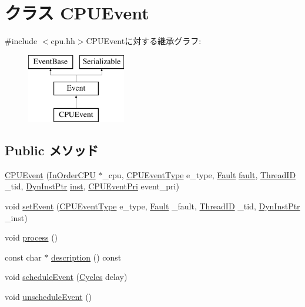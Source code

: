 \hypertarget{classInOrderCPU_1_1CPUEvent}{
\section{クラス CPUEvent}
\label{classInOrderCPU_1_1CPUEvent}
}


{\ttfamily \#include $<$cpu.hh$>$}CPUEventに対する継承グラフ:\begin{figure}[H]
\begin{center}
\leavevmode
\includegraphics[height=3cm]{classInOrderCPU_1_1CPUEvent}
\end{center}
\end{figure}
\subsection*{Public メソッド}
\begin{DoxyCompactItemize}
\item 
\hyperlink{classInOrderCPU_1_1CPUEvent_ae9e21ea59aa814f54bf9cbe72ac632d5}{CPUEvent} (\hyperlink{classInOrderCPU_1_1InOrderCPU}{InOrderCPU} $\ast$\_\-cpu, \hyperlink{classInOrderCPU_aedc081b7a3ef1b1568e62dec4a64c1ca}{CPUEventType} e\_\-type, \hyperlink{classRefCountingPtr}{Fault} \hyperlink{classInOrderCPU_1_1CPUEvent_a68714ceb74c60ea7ef5dec335bb6c5d7}{fault}, \hyperlink{base_2types_8hh_ab39b1a4f9dad884694c7a74ed69e6a6b}{ThreadID} \_\-tid, \hyperlink{classRefCountingPtr}{DynInstPtr} \hyperlink{classInOrderCPU_1_1CPUEvent_af5d4fb974eeb4507d4c837d365d0cefc}{inst}, \hyperlink{classInOrderCPU_a4381feb1878b9c1ea6f5dd3eed8d3197}{CPUEventPri} event\_\-pri)
\item 
void \hyperlink{classInOrderCPU_1_1CPUEvent_a8f450de378476d87c71f9a3790d68c02}{setEvent} (\hyperlink{classInOrderCPU_aedc081b7a3ef1b1568e62dec4a64c1ca}{CPUEventType} e\_\-type, \hyperlink{classRefCountingPtr}{Fault} \_\-fault, \hyperlink{base_2types_8hh_ab39b1a4f9dad884694c7a74ed69e6a6b}{ThreadID} \_\-tid, \hyperlink{classRefCountingPtr}{DynInstPtr} \_\-inst)
\item 
void \hyperlink{classInOrderCPU_1_1CPUEvent_a2e9c5136d19b1a95fc427e0852deab5c}{process} ()
\item 
const char $\ast$ \hyperlink{classInOrderCPU_1_1CPUEvent_a5a14fe478e2393ff51f02e9b7be27e00}{description} () const 
\item 
void \hyperlink{classInOrderCPU_1_1CPUEvent_af53dcbdc9da1cc615d43ff3bd2b4162c}{scheduleEvent} (\hyperlink{classCycles}{Cycles} delay)
\item 
void \hyperlink{classInOrderCPU_1_1CPUEvent_a8521a64adc8d310754330bc7dfe48831}{unscheduleEvent} ()
\end{DoxyCompactItemize}
